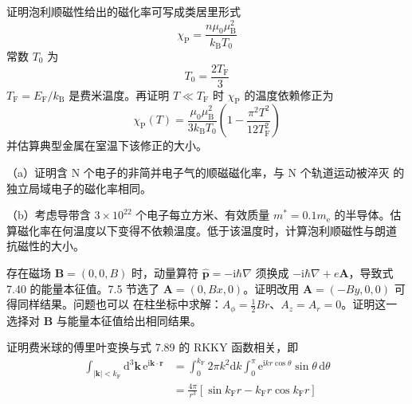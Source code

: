  证明泡利顺磁性给出的磁化率可写成类居里形式
\begin{equation*}
\chi_{\mathrm{P}} = \frac{n\mu_0\mu_{\mathrm{B}}^{2}}{k_{\mathrm{B}}T_0}\tag{7.92}
\end{equation*}
常数 $T_0$ 为
\begin{equation*}
T_0 = \frac{2T_{\mathrm{F}}}{3}\tag{7.93}
\end{equation*}
$T_{\mathrm{F}}=E_{\mathrm{F}}/k_{\mathrm{B}}$ 是费米温度。再证明 $T\ll T_{\mathrm{F}}$
时 $\chi_{\mathrm{P}}$ 的温度依赖修正为
\begin{equation*}
\chi_{\mathrm{P}}(T) = \frac{\mu_0\mu_{\mathrm{B}}^{2}}{3k_{\mathrm{B}}T_0}\left(1-\frac{\pi^{2}T^{2}}{12T_{\mathrm{F}}^{2}}\right)\tag{7.94}
\end{equation*}
并估算典型金属在室温下该修正的大小。

 （a）证明含 N 个电子的非简并电子气的顺磁磁化率，与 N 个轨道运动被淬灭
的独立局域电子的磁化率相同。

（b）考虑导带含 $3\times10^{22}$ 个电子每立方米、有效质量 $m^{*}=0.1m_{\mathrm{e}}$
的半导体。估算磁化率在何温度以下变得不依赖温度。低于该温度时，计算泡利顺磁性与朗道
抗磁性的大小。

 存在磁场 $\mathbf{B}=(0,0,B)$ 时，动量算符 $\hat{\mathbf{p}}=-\mathrm{i}\hbar\nabla$
须换成 $-\mathrm{i}\hbar\nabla+e\mathbf{A}$，导致式 7.40 的能量本征值。7.5 节选了
$\mathbf{A}=(0,Bx,0)$。证明改用 $\mathbf{A}=(-By,0,0)$ 可得同样结果。问题也可以
在柱坐标中求解：$A_{\phi}=\frac{1}{2}Br$、$A_z=A_r=0$。证明这一选择对 $\mathbf{B}$
与能量本征值给出相同结果。

 证明费米球的傅里叶变换与式 7.89 的 RKKY 函数相关，即
\begin{align*}
\int_{|\mathbf{k}|<k_{\mathrm{F}}}\mathrm{d}^{3}\mathbf{k}\,\mathrm{e}^{\mathrm{i}\mathbf{k}\cdot\mathbf{r}} &= \int_{0}^{k_{\mathrm{F}}}2\pi k^{2}\mathrm{d}k\int_{0}^{\pi}\mathrm{e}^{\mathrm{i}kr\cos\theta}\sin\theta\,\mathrm{d}\theta\\
&= \frac{4\pi}{r^{3}}\left[\sin k_{\mathrm{F}}r - k_{\mathrm{F}}r\cos k_{\mathrm{F}}r\right]\tag{7.95}
\end{align*}

